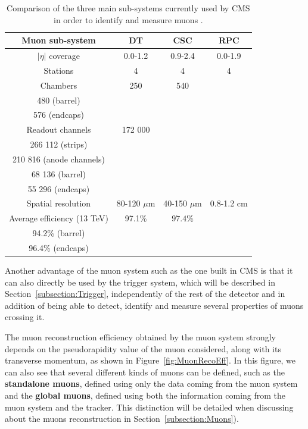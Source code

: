 \documentclass[a4paper, 10pt, openright]{report}
\begin{document}
\begin{table}[h!]
\begin{center}
\begin{tabular}{ c|c|c|c } 
 \hline
 Muon sub-system & \ac{DT} & \ac{CSC} & \ac{RPC} \\
 \hline
 $|\eta|$ coverage & 0.0-1.2 & 0.9-2.4 & 0.0-1.9 \\
 Stations & 4 & 4 & 4 \\
 Chambers & 250 & 540 & \makecell{\vspace{-10pt} \\ 480 (barrel) \\ 576 (endcaps)} \\
 Readout channels & 172 000 & \makecell{\vspace{-10pt} \\ 266 112 (strips) \\ 210 816 (anode channels)} & \makecell{\vspace{-10pt} \\ 68 136 (barrel) \\ 55 296 (endcaps)} \\
 Spatial resolution & 80-120 $\mu$m & 40-150 $\mu$m & 0.8-1.2 cm \\
 Average efficiency (13 TeV) & 97.1\% & $97.4$\% & \makecell{\vspace{-10pt} \\ 94.2\% (barrel) \\ 96.4\% (endcaps)} \\ 
 \hline
\end{tabular}
\caption{Comparison of the three main sub-systems currently used by \ac{CMS} in order to identify and measure muons \cite{MuonSystemsEff}.}
\label{table:CMSMuonsSystems}
\end{center}
\end{table}

Another advantage of the muon system such as the one built in \ac{CMS} is that it can also directly be used by the trigger system, which will be described in Section~\ref{subsection:Trigger}, independently of the rest of the detector and in addition of being able to detect, identify and measure several properties of muons crossing it.

The muon reconstruction efficiency obtained by the muon system strongly depends on the pseudorapidity value of the muon considered, along with its transverse momentum, as shown in Figure~\ref{fig:MuonRecoEff}. In this figure, we can also see that several different kinds of muons can be defined, such as the \textbf{standalone muons}, defined using only the data coming from the muon system and the \textbf{global muons}, defined using both the information coming from the muon system and the tracker. This distinction will be detailed when discussing about the muons reconstruction in Section~\ref{subsection:Muons}). %
\end{document}
